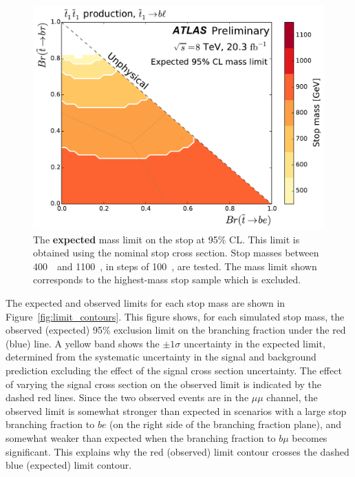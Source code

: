 \begin{figure}[p]
  \centering
  \includegraphics[width=\textwidth]
  {figs/blstop/mass_limit_contours_no_extras_exp.pdf}
  \caption[
    The \textbf{expected} mass limit on the stop at 95\% CL.
  ]{
    The \textbf{expected} mass limit on the stop at 95\% CL.
    This limit is obtained using the nominal stop cross section.
    Stop masses between 400~\GeV\ and 1100~\GeV, in steps of 100~\GeV, are
    tested.
    The mass limit shown corresponds to the highest-mass stop sample which is
    excluded.
  }
  \label{fig:mass_limit_exp}
\end{figure}

The expected and observed limits for each stop mass are shown in
Figure~\ref{fig:limit_contours}.
This figure shows, for each simulated stop mass, the observed (expected)
95\% exclusion limit on the branching fraction under the red (blue) line.
A yellow band shows the $\pm 1\sigma$ uncertainty in the expected limit,
determined from the systematic uncertainty in the signal and background
prediction excluding the effect of the signal cross section uncertainty.
The effect of varying the signal cross section on the observed limit is
indicated by the dashed red lines.
Since the two observed events are in the $\mu\mu$ channel, the observed limit
is somewhat stronger than expected in scenarios with a large stop branching
fraction to $be$ (on the right side of the branching fraction plane), and somewhat
weaker than expected when the branching fraction to $b\mu$ becomes significant.
This explains why the red (observed) limit contour crosses the dashed
blue (expected) limit contour.

